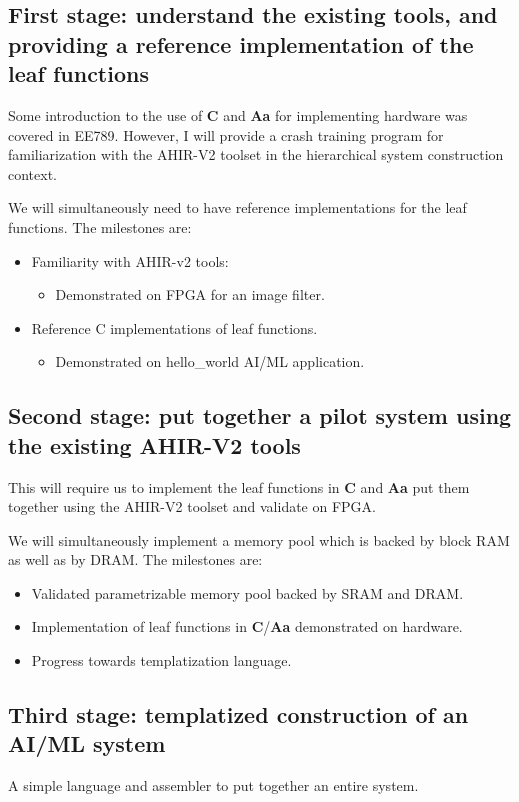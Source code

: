 \documentclass{article}
\begin{document}
\subsection{First stage: understand the existing tools, and providing a reference implementation of the leaf functions}

Some introduction to the use of {\bf C} and {\bf Aa} for implementing 
hardware was covered in EE789.  However, I will provide a crash training
program for familiarization with the AHIR-V2 toolset in the hierarchical
system construction context.

We will simultaneously need to have reference implementations for the leaf functions.
The milestones are:
\begin{itemize}
\item Familiarity with AHIR-v2 tools:
\begin{itemize}
\item Demonstrated on FPGA for an image filter.
\end{itemize}
\item Reference C implementations of leaf functions.
\begin{itemize}
\item Demonstrated on hello\_world AI/ML application.
\end{itemize}
\end{itemize}

\subsection{Second stage: put together a pilot system using the existing AHIR-V2 tools}

This will require us to implement the leaf functions in {\bf C} and {\bf Aa} put them
together using the AHIR-V2 toolset and validate on FPGA.

We will simultaneously implement a memory pool which is backed by block RAM as well
as by DRAM.
The milestones are:
\begin{itemize}
\item Validated parametrizable memory pool backed by SRAM and DRAM.
\item Implementation of leaf functions in {\bf C}/{\bf Aa} demonstrated on
hardware.
\item Progress towards templatization language.
\end{itemize}

\subsection{Third stage: templatized construction of an AI/ML system}

A simple language and assembler to put together an entire system.
\end{document}

